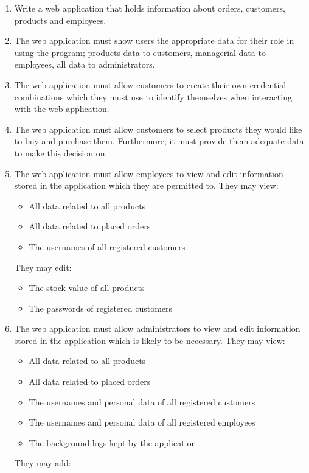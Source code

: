\documentclass{article}
\begin{document}
    \begin{enumerate}
    \item Write a web application that holds information about orders, customers, products and employees. 
    \item The web application must show users the appropriate data for their role in using the program; products data to customers, managerial data to employees, all data to administrators.
    \item The web application must allow customers to create their own credential combinations which they must use to identify themselves when interacting with the web application.
    \item The web application must allow customers to select products they would like to buy and purchase them. 
    Furthermore, it must provide them adequate data to make this decision on. 
    \item The web application must allow employees to view and edit information stored in the application which they are permitted to. They may view:
    \begin{itemize}
    \item All data related to all products
    \item All data related to placed orders
    \item The usernames of all registered customers
    \end{itemize}
    They may edit: 
    \begin{itemize}
    \item The stock value of all products
    \item The passwords of registered customers
    \end{itemize}
    \item The web application must allow administrators to view and edit information stored in the application which is likely to be necessary. They may view:
    \begin{itemize}
    \item All data related to all products
    \item All data related to placed orders
    \item The usernames and personal data of all registered customers
    \item The usernames and personal data of all registered employees
    \item The background logs kept by the application
    \end{itemize}
    They may add:
    \begin{itemize}

\end{itemize}
\end{enumerate}
\end{document}
